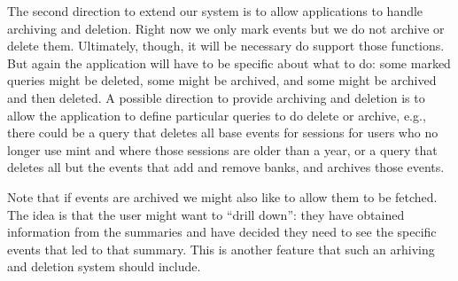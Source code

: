 The second direction to extend our system is to allow applications to handle archiving and deletion. Right now we only mark events but we do not archive or delete them. Ultimately, though, it will be necessary do support those functions. But again the application will have to be specific about what to do: some marked queries might be deleted, some might be archived, and some might be archived and then deleted. A possible direction to provide archiving and deletion is to allow the application to define particular queries to do delete or archive, e.g., there could be a query that deletes all base events for sessions for users who no longer use mint and where those sessions are older than a year, or a query that deletes all but the events that add and remove banks, and archives those events.

Note that if events are archived we might also like to allow them to be fetched. The idea is that the user might want to ``drill down'': they have obtained information from the summaries and have decided they need to see the specific events that led to that summary. This is another feature that such an arhiving and deletion system should include.


